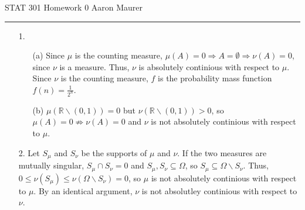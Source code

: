 \documentclass[11pt]{article}
\newcommand{\R}{\mathbb{R}}
\theoremstyle{definition}
\begin{document}
STAT 301 Homework 0 \hfill Aaron Maurer
\vspace{2mm}
\hrule
\vspace{2mm}
\begin{itemize}
    \item[1.]
        \begin{itemize}
            \item[(a)] Since $\mu$ is the counting measure, \(\mu(A)=0\Rightarrow A=\emptyset \Rightarrow \nu(A)=0\), since $\nu$ is a measure. Thus, $\nu$ is absolutely continious with respect to $\mu$. Since $\nu$ is the counting measure, $f$ is the probability mass function \(f(n)=\frac{1}{2^n}\).
            \item[(b)] \(\mu\left(\R\backslash(0,1)\right)=0\) but \(\nu\left(\R\backslash(0,1)\right)>0\), so \(\mu(A)=0\not\Rightarrow\nu(A)=0\) and $\nu$ is not absolutely continious with respect to $\mu$.
        \end{itemize}
    \item[2.]
        Let \(S_\mu\) and \(S_\nu\) be the supports of $\mu$ and $\nu$. If the two measures are mutually singular, \(S_\mu\cap S_\nu=0\) and \(S_\mu,S_\nu\subseteq \Omega\), so \(S_\mu\subseteq \Omega\backslash S_\nu\). Thus, \(0\leq\nu(S_\mu)\leq\nu(\Omega\backslash S_\nu)=0\), so $\mu$ is not absolutely continious with respect to $\mu$. By an identical argument, $\nu$ is not absolutley continious with respect to $\nu$.
\end{itemize}
\end{document}
